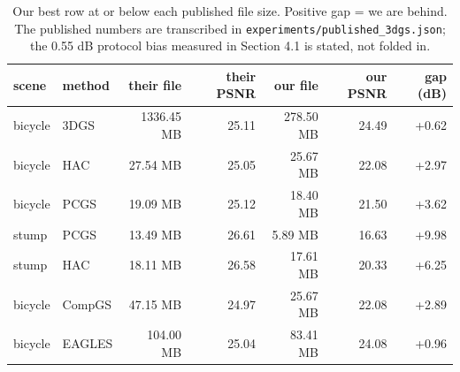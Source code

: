 \begin{table}[t]
\centering
\small
\footnotesize
\setlength{\tabcolsep}{2.8pt}
\caption{Our best row at or below each published file size. Positive gap = we are behind. The published numbers are transcribed in \texttt{experiments/published\_3dgs.json}; the 0.55 dB protocol bias measured in Section 4.1 is stated, not folded in.}
\label{tab:gap}
\begin{tabular}{llrrrrr}
\toprule
scene & method & their file & their PSNR & our file & our PSNR & gap (dB) \\
\midrule
bicycle & 3DGS & 1336.45 MB & 25.11 & 278.50 MB & 24.49 & +0.62 \\
bicycle & HAC & 27.54 MB & 25.05 & 25.67 MB & 22.08 & +2.97 \\
bicycle & PCGS & 19.09 MB & 25.12 & 18.40 MB & 21.50 & +3.62 \\
stump & PCGS & 13.49 MB & 26.61 & 5.89 MB & 16.63 & +9.98 \\
stump & HAC & 18.11 MB & 26.58 & 17.61 MB & 20.33 & +6.25 \\
bicycle & CompGS & 47.15 MB & 24.97 & 25.67 MB & 22.08 & +2.89 \\
bicycle & EAGLES & 104.00 MB & 25.04 & 83.41 MB & 24.08 & +0.96 \\
\bottomrule
\end{tabular}
\end{table}
